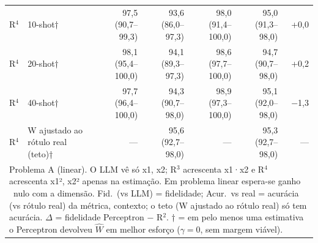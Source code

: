 \begin{table}[htbp]
\begin{tabular}{llrrrrr}
R$^4$ & 10-shot† & 97,5 (90,7–99,3) & 93,6 (86,0–97,3) & 98,0 (91,4–100,0) & 95,0 (91,3–98,0) & +0,0 \\
R$^4$ & 20-shot† & 98,1 (95,4–100,0) & 94,1 (89,3–97,3) & 98,6 (97,7–100,0) & 94,7 (90,7–98,0) & +0,2 \\
R$^4$ & 40-shot† & 97,7 (96,4–100,0) & 94,3 (90,7–98,0) & 98,9 (97,3–100,0) & 95,1 (92,0–98,0) & $-$1,3 \\
R$^4$ & W ajustado ao rótulo real (teto)† & — & 95,6 (92,7–98,0) & — & 95,3 (92,7–98,0) & — \\
\bottomrule
\multicolumn{7}{p{0.95\linewidth}}{\footnotesize Problema A (linear). O LLM vê só x1, x2; R$^3$ acrescenta x1·x2 e R$^4$ acrescenta x1², x2² apenas na estimação. Em problema linear espera-se ganho ~nulo com a dimensão. Fid.\ (vs LLM) = fidelidade; Acur.\ vs real = acurácia (vs rótulo real) da métrica, contexto; o teto (W ajustado ao rótulo real) só tem acurácia. $\Delta$ = fidelidade Perceptron $-$ R$^2$. † = em pelo menos uma estimativa o Perceptron devolveu $\hat{W}$ em melhor esforço ($\gamma = 0$, sem margem viável).} \\
\end{tabular}
\end{table}

